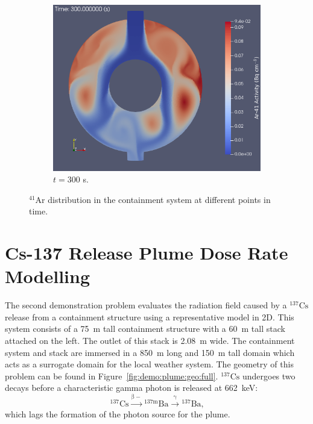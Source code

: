 \begin{figure}[H]
\begin{subfigure}[b]{0.495\textwidth}
    \end{subfigure}
    \hfill
    \begin{subfigure}[b]{0.495\textwidth}
        \centering
        \includegraphics[width=\textwidth]{images/demos/bwr_shield/ar41/ar41_300s.png}
        \caption{$t = 300$ s.}
        \label{fig:demo:bwr:ar41:300}
    \end{subfigure}
    \caption{$\mathrm{^{41}Ar}$ distribution in the containment system at different points in time.}
    \label{fig:demo:bwr:ar41}
\end{figure}

\section{Cs-137 Release Plume Dose Rate Modelling}
\label{demos:demonstrations:cs_137_plume}

The second demonstration problem evaluates the radiation field caused by a $\mathrm{^{137}Cs}$ release from a containment structure using a representative model in 2D. This system consists of a 75~m tall containment structure with a 60~m tall stack attached on the left. The outlet of this stack is 2.08~m wide. The containment system and stack are immersed in a 850~m long and 150~m tall domain which acts as a surrogate domain for the local weather system. The geometry of this problem can be found in Figure~\ref{fig:demo:plume:geo:full}. $\mathrm{^{137}Cs}$ undergoes two decays before a characteristic gamma photon is released at 662~keV:
\begin{equation*}
    \mathrm{^{137}Cs} \xrightarrow{\mathrm{\beta-}} \mathrm{^{137m}Ba} \xrightarrow{\mathrm{\gamma}} \mathrm{^{137}Ba}\text{,}
\end{equation*}
which lags the formation of the photon source for the plume.

